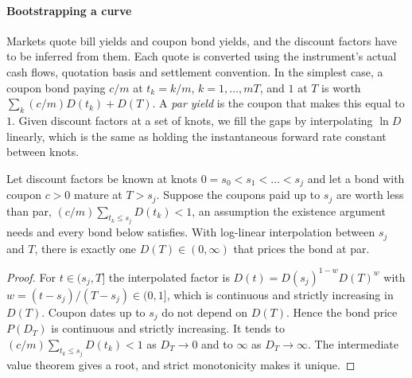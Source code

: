 \begin{chapterrefs}
\paragraph{Bootstrapping a curve} Markets quote bill yields and coupon bond yields, and the discount
factors have to be inferred from them. Each quote is converted using the instrument's actual cash
flows, quotation basis and settlement convention. In the simplest case, a coupon bond paying $c/m$ at $t_k=k/m$, $k=1,\dots,mT$, and $1$ at $T$ is worth
$\sum_k (c/m)D(t_k)+D(T)$. A \emph{par yield} is the coupon that makes this equal to $1$. Given
discount factors at a set of knots, we fill the gaps by interpolating $\ln D$ linearly, which is the
same as holding the instantaneous forward rate constant between knots.

\begin{proposition}[Bootstrapping]\label{prop4:boot}
Let discount factors be known at knots $0=s_0<s_1<\dots<s_j$ and let a bond with coupon $c>0$ mature
at $T>s_j$. Suppose the coupons paid up to $s_j$ are worth less than par, $(c/m)\sum_{t_k\le s_j}D(t_k)<1$,
an assumption the existence argument needs and every bond below satisfies. With log-linear interpolation between $s_j$ and $T$, there is
exactly one $D(T)\in(0,\infty)$ that prices the bond at par.
\end{proposition}

\begin{proof}
For $t\in(s_j,T]$ the interpolated factor is $D(t)=D(s_j)^{1-w}D(T)^{w}$ with $w=(t-s_j)/(T-s_j)\in(0,1]$,
which is continuous and strictly increasing in $D(T)$. Coupon dates up to $s_j$ do not depend on
$D(T)$. Hence the bond price $P(D_T)$ is continuous and strictly increasing. It tends to
$(c/m)\sum_{t_k\le s_j}D(t_k)<1$ as $D_T\to0$ and to $\infty$ as $D_T\to\infty$. The intermediate value
theorem gives a root, and strict monotonicity makes it unique.
\end{proof}


\end{chapterrefs}
